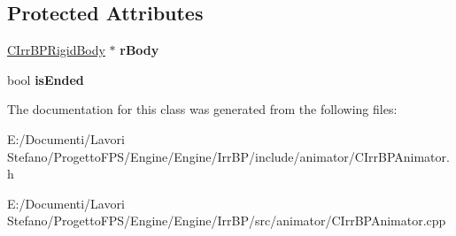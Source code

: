 \subsection*{Protected Attributes}
\begin{DoxyCompactItemize}
\item 
\hypertarget{class_c_irr_b_p_animator_ae6289019bc35da3419f405572cde1cbc}{
\hyperlink{class_c_irr_b_p_rigid_body}{CIrrBPRigidBody} $\ast$ {\bfseries rBody}}
\label{class_c_irr_b_p_animator_ae6289019bc35da3419f405572cde1cbc}

\item 
\hypertarget{class_c_irr_b_p_animator_a3b626ca4dc93b1496d66ce87f315c0ab}{
bool {\bfseries isEnded}}
\label{class_c_irr_b_p_animator_a3b626ca4dc93b1496d66ce87f315c0ab}

\end{DoxyCompactItemize}


The documentation for this class was generated from the following files:\begin{DoxyCompactItemize}
\item 
E:/Documenti/Lavori Stefano/ProgettoFPS/Engine/Engine/IrrBP/include/animator/CIrrBPAnimator.h\item 
E:/Documenti/Lavori Stefano/ProgettoFPS/Engine/Engine/IrrBP/src/animator/CIrrBPAnimator.cpp\end{DoxyCompactItemize}
